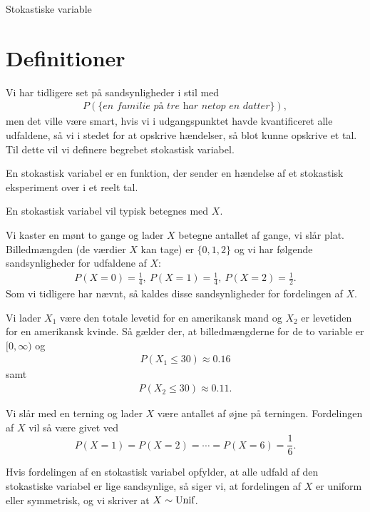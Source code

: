 \begin{center}
\Huge
Stokastiske variable
\end{center}
\section*{Definitioner}

Vi har tidligere set på sandsynligheder i stil med 
\begin{align*}
P(\{\textit{en familie på tre har netop en datter}\}),
\end{align*}
men det ville være smart, hvis vi i udgangspunktet havde kvantificeret alle udfaldene, så vi i stedet for at opskrive hændelser, så blot kunne opskrive et tal. Til dette vil vi definere begrebet stokastisk variabel.
\begin{defn}
En stokastisk variabel er en funktion, der sender en hændelse af et stokastisk eksperiment over i et reelt tal. 
\end{defn}
En stokastisk variabel vil typisk betegnes med $X$.
\begin{exa}
Vi kaster en mønt to gange og lader $X$ betegne antallet af gange, vi slår plat. Billedmængden (de værdier $X$ kan tage) er $\{0,1,2\}$ og vi har følgende sandsynligheder for udfaldene af $X$:
\begin{align*}
P(X=0) = \frac{1}{4}, \ P(X=1) = \frac{1}{4}, \ P(X=2) = \frac{1}{2}. 
\end{align*}
Som vi tidligere har nævnt, så kaldes disse sandsynligheder for fordelingen af $X$.
\end{exa}
\begin{exa}
Vi lader $X_1$ være den totale levetid for en amerikansk mand og $X_2$ er levetiden for en amerikansk kvinde. Så gælder der, at billedmængderne for de to variable er $[0,\infty)$ og
\begin{align*}
P(X_1\leq 30) \approx 0.16
\end{align*} 
samt
\begin{align*}
P(X_2\leq 30) \approx 0.11.
\end{align*}
\end{exa}
\begin{exa}
Vi slår med en terning og lader $X$ være antallet af øjne på terningen. Fordelingen af $X$ vil så være givet ved
\[P(X=1) = P(X=2) = \cdots = P(X=6) = \frac{1}{6}.\]
\end{exa}
Hvis fordelingen af en stokastisk variabel opfylder, at alle udfald af den stokastiske variabel er lige sandsynlige, så siger vi, at fordelingen af $X$ er uniform eller symmetrisk, og vi skriver at $X \sim \textnormal{Unif}$.

